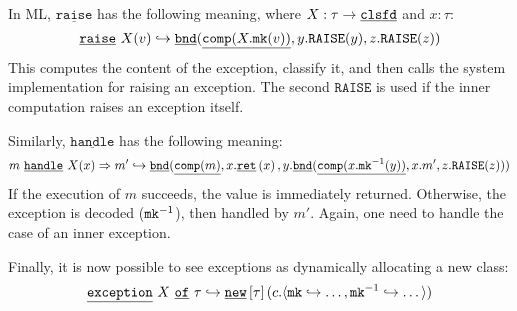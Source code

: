 \documentclass[ manuscript,screen, nonacm]{acmart}
\begin{document}
In ML, \(\mathtt{\underline{raise}}\) has the following meaning, where \(X : \tau \rightarrow \underline{\mathtt{clsfd}}\) and \(x : \tau\):
\[
  \mathtt{\underline{raise}}~X(v) \hookrightarrow \underline{\mathtt{bnd}}(\underline{\mathtt{comp}(X.\mathtt{mk}(v))}, y.\mathtt{RAISE}(y), 
  z.\mathtt{RAISE}(z))
\]
This computes the content of the exception, classify it, and then calls the system
implementation for raising an exception. The second \(\mathtt{RAISE}\) is used if
the inner computation raises an exception itself.

Similarly, \(\underline{\mathtt{handle}}\) has the following meaning:
\[
  m~\mathtt{\underline{handle}}~X(x) \Rightarrow m' \hookrightarrow
    \underline{\mathtt{bnd}}(\underline{\mathtt{comp}(m)}, x.\underline{\mathtt{ret}}\left(x\right), y.\underline{\mathtt{bnd}}(\underline{\mathtt{comp}(x.\mathtt{mk}^{-1}(y))}, x.m', z.\mathtt{RAISE}(z)))
\]
If the execution of \(m\) succeeds, the value is immediately returned. Otherwise,
the exception is decoded (\(\mathtt{mk}^{-1}\)), then handled by \(m'\). Again, one need to handle
the case of an inner exception.

Finally, it is now possible to see exceptions as dynamically allocating a new class:
\[
\underline{\mathtt{exception}}~X~\underline{\mathtt{of}}~\tau \hookrightarrow
\underline{\mathtt{new}}\left[\tau\right](c.\langle \mathtt{mk}\hookrightarrow \dots, \mathtt{mk}^{-1} \hookrightarrow \dots\rangle)
\]
\end{document}
